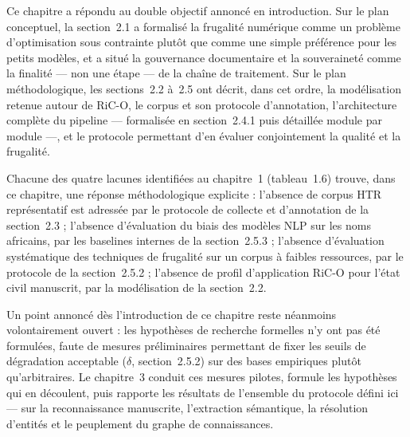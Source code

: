 Ce chapitre a répondu au double objectif annoncé en introduction. Sur le plan conceptuel, la section~2.1 a formalisé la frugalité numérique comme un problème d'optimisation sous contrainte plutôt que comme une simple préférence pour les petits modèles, et a situé la gouvernance documentaire et la souveraineté comme la finalité --- non une étape --- de la chaîne de traitement.
Sur le plan méthodologique, les sections~2.2 à~2.5 ont décrit, dans cet ordre, la modélisation retenue autour de RiC-O, le corpus et son protocole d'annotation, l'architecture complète du pipeline --- formalisée en section~2.4.1 puis détaillée module par module ---, et le protocole permettant d'en évaluer conjointement la qualité et la frugalité.

Chacune des quatre lacunes identifiées au chapitre~1 (tableau~1.6) trouve, dans ce chapitre, une réponse méthodologique explicite : l'absence de corpus HTR représentatif est adressée par le protocole de collecte et d'annotation de la section~2.3 ; l'absence d'évaluation du biais des modèles NLP sur les noms africains, par les baselines internes de la section~2.5.3 ; l'absence d'évaluation systématique des techniques de frugalité sur un corpus à faibles ressources, par le protocole de la section~2.5.2 ; l'absence de profil d'application RiC-O pour l'état civil manuscrit, par la modélisation de la section~2.2.

Un point annoncé dès l'introduction de ce chapitre reste néanmoins volontairement ouvert : les hypothèses de recherche formelles n'y ont pas été formulées, faute de mesures préliminaires permettant de fixer les seuils de dégradation acceptable ($\delta$, section~2.5.2) sur des bases empiriques plutôt qu'arbitraires.
Le chapitre~3 conduit ces mesures pilotes, formule les hypothèses qui en découlent, puis rapporte les résultats de l'ensemble du protocole défini ici --- sur la reconnaissance manuscrite, l'extraction sémantique, la résolution d'entités et le peuplement du graphe de connaissances.